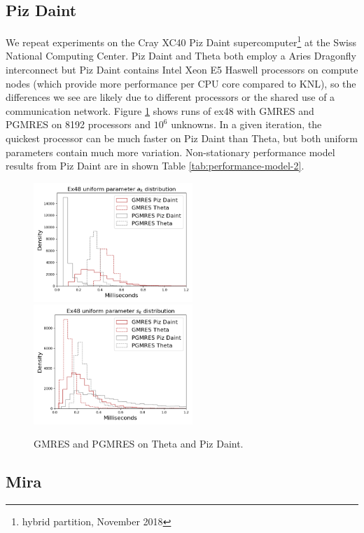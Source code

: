 \documentclass[sigconf]{acmart}
\begin{document}
\subsection{Piz Daint}\label{sec:pizdaint}

We repeat experiments on the Cray XC40 Piz Daint supercomputer\footnote{hybrid partition, November 2018} at the Swiss National Computing Center. 
Piz Daint and Theta both employ a Aries Dragonfly interconnect but Piz Daint contains Intel Xeon E5 Haswell  processors \cite{hammarlund2014haswell} on compute nodes (which provide more performance per CPU core compared to KNL), so the differences we see are likely due to different processors or the shared use of a communication network.
Figure \ref{fig:pizdaint} shows runs of ex48 with GMRES and PGMRES on 8192 processors and $10^6$ unknowns. 
In a given iteration, the quickest processor can be much faster on Piz Daint than Theta, but both uniform parameters contain much more variation.
Non-stationary performance model results from Piz Daint are in shown Table \ref{tab:performance-model-2}.

\begin{figure}[b]
\centering
\includegraphics[width=6cm]{../plots/THETA_PIZDAINT_ex48_8192_1000000_uniform_a_k.png} 
\includegraphics[width=6cm]{../plots/THETA_PIZDAINT_ex48_8192_1000000_uniform_s_k.png}
\caption{GMRES and PGMRES on Theta and Piz Daint.} \label{fig:pizdaint}
\end{figure}


\subsection{Mira}\label{sec:mira}
\end{document}
